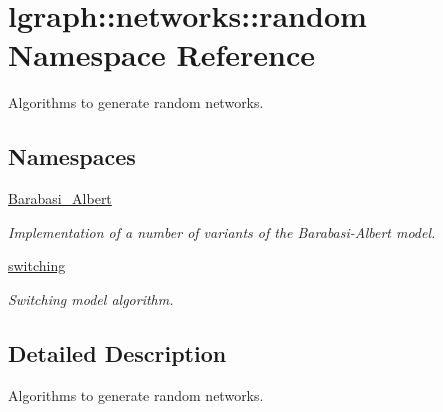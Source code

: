 \hypertarget{namespacelgraph_1_1networks_1_1random}{}\section{lgraph\+:\+:networks\+:\+:random Namespace Reference}
\label{namespacelgraph_1_1networks_1_1random}


Algorithms to generate random networks.  


\subsection*{Namespaces}
\begin{DoxyCompactItemize}
\item 
 \hyperlink{namespacelgraph_1_1networks_1_1random_1_1Barabasi__Albert}{Barabasi\+\_\+\+Albert}
\begin{DoxyCompactList}\small\item\em Implementation of a number of variants of the Barabasi-\/\+Albert model. \end{DoxyCompactList}\item 
 \hyperlink{namespacelgraph_1_1networks_1_1random_1_1switching}{switching}
\begin{DoxyCompactList}\small\item\em Switching model algorithm. \end{DoxyCompactList}\end{DoxyCompactItemize}


\subsection{Detailed Description}
Algorithms to generate random networks. 